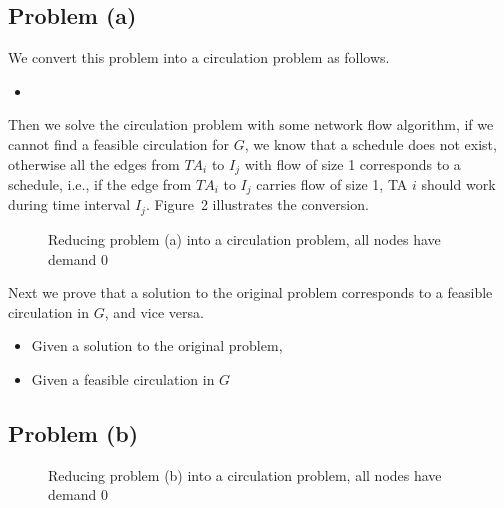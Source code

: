 \documentclass[12pt,letterpaper]{article}
\begin{document}
\subsection*{Problem (a)}
We convert this problem into a circulation problem as follows.
\begin{itemize}
\item 
\end{itemize}
Then we solve the circulation problem with some network flow algorithm, if we cannot find a feasible circulation for $G$, we know that a schedule does not exist, otherwise all the edges from $TA_i$ to $I_j$ with flow of size 1 corresponds to a schedule, i.e., if the edge from $TA_i$ to $I_j$ carries flow of size 1, TA $i$ should work during time interval $I_j$. Figure~2 illustrates the conversion.
\begin{figure}
\begin{center}
\caption{Reducing problem (a) into a circulation problem, all nodes have demand 0}
\end{center}
\end{figure}

Next we prove that a solution to the original problem corresponds to a feasible circulation in $G$, and vice versa.
\begin{itemize}
\item Given a solution to the original problem, 
\item Given a feasible circulation in $G$
\end{itemize}

\subsection*{Problem (b)}
\begin{figure}
\begin{center}
\caption{Reducing problem (b) into a circulation problem, all nodes have demand 0}
\end{center}
\end{figure}
\end{document}
